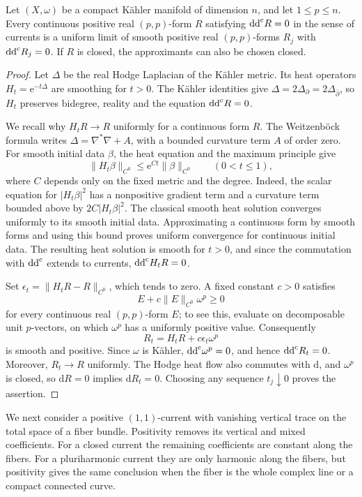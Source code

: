 \begin{lemma}\label{lem:continuous-pluriharmonic-smoothing}
Let $(X,\omega)$ be a compact K\"ahler manifold of dimension $n$, and let $1\leq p\leq n$. Every continuous positive real $(p,p)$-form $R$ satisfying $\mathrm{dd}^{\mathrm{c}} R=0$ in the sense of currents is a uniform limit of smooth positive real $(p,p)$-forms $R_j$ with $\mathrm{dd}^{\mathrm{c}} R_j=0$. If $R$ is closed, the approximants can also be chosen closed.
\end{lemma}
\begin{proof}
Let $\Delta$ be the real Hodge Laplacian of the K\"ahler metric. Its heat operators $H_t=\mathrm e^{-t\Delta}$ are smoothing for $t>0$. The K\"ahler identities give $\Delta=2\Delta_\partial=2\Delta_{\bar\partial}$, so $H_t$ preserves bidegree, reality and the equation $\mathrm{dd}^{\mathrm{c}} R=0$.

We recall why $H_tR\to R$ uniformly for a continuous form $R$. The Weitzenb\"ock formula writes $\Delta=\nabla^*\nabla+A$, with a bounded curvature term $A$ of order zero. For smooth initial data $\beta$, the heat equation and the maximum principle give
\[
 \|H_t\beta\|_{C^0}\leq\mathrm e^{Ct}\|\beta\|_{C^0}
 \qquad(0<t\leq1),
\]
where $C$ depends only on the fixed metric and the degree. Indeed, the scalar equation for $|H_t\beta|^2$ has a nonpositive gradient term and a curvature term bounded above by $2C|H_t\beta|^2$. The classical smooth heat solution converges uniformly to its smooth initial data. Approximating a continuous form by smooth forms and using this bound proves uniform convergence for continuous initial data. The resulting heat solution is smooth for $t>0$, and since the commutation with $\mathrm{dd}^{\mathrm{c}}$ extends to currents, $\mathrm{dd}^{\mathrm{c}} H_tR=0$.

Set $\epsilon_t=\|H_tR-R\|_{C^0}$, which tends to zero. A fixed constant $c>0$ satisfies
\[
 E+c\|E\|_{C^0}\omega^p\geq0
\]
for every continuous real $(p,p)$-form $E$; to see this, evaluate on decomposable unit $p$-vectors, on which $\omega^p$ has a uniformly positive value. Consequently
\[
 R_t=H_tR+c\epsilon_t\omega^p
\]
is smooth and positive. Since $\omega$ is K\"ahler, $\mathrm{dd}^{\mathrm{c}}\omega^p=0$, and hence $\mathrm{dd}^{\mathrm{c}} R_t=0$. Moreover, $R_t\to R$ uniformly. The Hodge heat flow also commutes with $\mathrm{d}$, and $\omega^p$ is closed, so $\mathrm{d}R=0$ implies $\mathrm{d}R_t=0$. Choosing any sequence $t_j\downarrow0$ proves the assertion.
\end{proof}

We next consider a positive $(1,1)$-current with vanishing vertical trace on the total space of a fiber bundle. Positivity removes its vertical and mixed coefficients. For a closed current the remaining coefficients are constant along the fibers. For a pluriharmonic current they are only harmonic along the fibers, but positivity gives the same conclusion when the fiber is the whole complex line or a compact connected curve.

